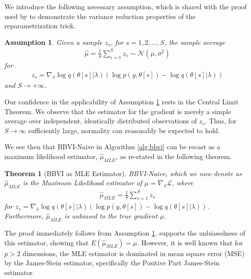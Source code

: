 \documentclass{article}
\newtheorem{assumption}{Assumption}
\newtheorem{theorem}{Theorem}
\begin{document}
We introduce the following necessary assumption, which is shared with the proof used by \cite{Xu-2019} to demonstrate the variance reduction properties of the reparametrization trick.

\begin{assumption}
    \label{asm:normal}
    Given a sample $z_s$, for $s = 1,2,..., S$, the sample average
    \begin{align*}
        \hat\mu = \frac{1}{S} \sum^{S}_{s = 1}z_s \sim \mathcal{N}(\mu, \sigma^2)
    \end{align*}
    for
    \begin{align*}
    z_s = \nabla_{\lambda} \log q(\theta[s] | \lambda) (\log p(y, \theta[s]) - \log q(\theta[s] | \lambda))
    \end{align*}
    and $S \to +\infty$.
\end{assumption}

Our confidence in the applicability of Assumption \ref{asm:normal} rests in the Central Limit Theorem. We observe that the estimator for the gradient is merely a simple average over independent, identically distributed observations of $z_s$. Thus, for $S \to \infty$ sufficiently large, normality can reasonably be expected to hold.

We see then that BBVI-Naive in Algorithm \ref{alg:bbvi} can be recast as a maximum likelihood estimator, $\hat\mu_{MLE}$, as re-stated in the following theorem.

\begin{theorem}[BBVI as MLE Estimator]
    BBVI-Naive, which we now denote as $\hat\mu_{MLE}$ is the Maximum Likelihood estimator of $\mu = \nabla_\lambda \mathcal{L}$, where   
    \begin{align}
        \hat\mu_{MLE} = \frac{1}{S} \sum^{S}_{s = 1} z_s
    \end{align}
    for $z_s = \nabla_{\lambda} \log q(\theta[s] | \lambda) (\log p(y, \theta[s]) - \log q(\theta[s] | \lambda))$. Furthermore, $\hat\mu_{MLE}$ is unbiased to the true gradient $\mu$.
\end{theorem}

The proof immediately follows from Assumption \ref{asm:normal}. \cite{Ranganath-2014} supports the unbiasedness of this estimator, showing that $E(\hat\mu_{MLE}) = \mu$. However, it is well known \cite{Lehmann-1998, Efron-1973} that for $p > 2$ dimensions, the MLE estimator is dominated in mean square error (MSE) by the James-Stein estimator, specifically the Positive Part James-Stein estimator.
\end{document}
